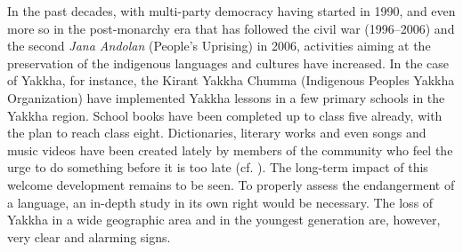 In the past decades, with multi-party democracy having started in 1990, and even more so in the post-monarchy era that has followed the civil war (1996–2006) and the second \emph{Jana Andolan} (People's Uprising) in 2006, activities aiming at the preservation of the indigenous languages and cultures have increased. In the case of Yakkha, for instance, the Kirant Yakkha Chumma (Indigenous Peoples Yakkha Organization) have implemented Yakkha lessons in a few primary schools in the Yakkha region.  School books have been completed up to class five already, with the plan to reach class eight. Dictionaries, literary works and even songs and music videos have been created lately by members of the community who feel the urge to do something before it is too late (cf. ). The long-term impact of this welcome development remains to be seen. To properly assess the endangerment of a language, an in-depth study in its own right would be necessary. The loss of Yakkha in a wide geographic area and in the youngest generation are, however, very clear and alarming signs.





